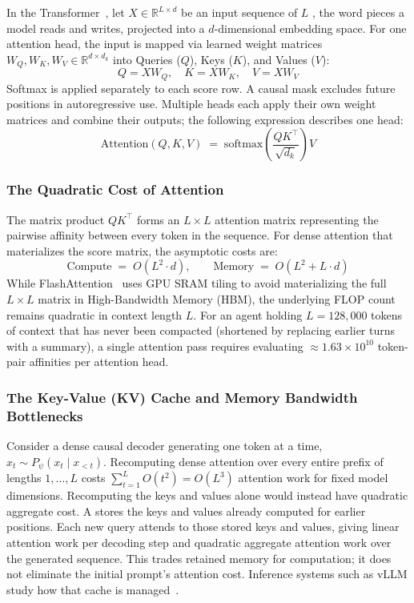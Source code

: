 In the Transformer~, let $X \in \mathbb{R}^{L \times d}$ be an input sequence of $L$ , the word pieces a model reads and writes, projected into a $d$-dimensional embedding space. For one attention head, the input is mapped via learned weight matrices $W_Q, W_K, W_V \in \mathbb{R}^{d \times d_k}$ into Queries ($Q$), Keys ($K$), and Values ($V$):
\begin{equation}
Q = X W_Q, \quad K = X W_K, \quad V = X W_V
\end{equation}
Softmax is applied separately to each score row. A causal mask excludes future positions in autoregressive use. Multiple heads each apply their own weight matrices and combine their outputs; the following expression describes one head:
\begin{equation}\label{eq:attention-formula}
\mathrm{Attention}(Q, K, V) \;=\; \mathrm{softmax}\left( \frac{Q K^\top}{\sqrt{d_k}} \right) V
\end{equation}

\subsubsection{The Quadratic Cost of Attention}
The matrix product $Q K^\top$ forms an $L \times L$ attention matrix representing the pairwise affinity between every token in the sequence. For dense attention that materializes the score matrix, the asymptotic costs are:
\begin{equation}
\mathrm{Compute} \;=\; O(L^2 \cdot d), \qquad \mathrm{Memory} \;=\; O(L^2 + L \cdot d)
\end{equation}
While FlashAttention~ uses GPU SRAM tiling to avoid materializing the full $L \times L$ matrix in High-Bandwidth Memory (HBM), the underlying FLOP count remains quadratic in context length $L$. For an agent holding $L = 128{,}000$ tokens of context that has never been compacted (shortened by replacing earlier turns with a summary), a single attention pass requires evaluating $\approx 1.63 \times 10^{10}$ token-pair affinities per attention head.

\subsubsection{The Key-Value (KV) Cache and Memory Bandwidth Bottlenecks}
Consider a dense causal decoder generating one token at a time,
$x_t\sim P_\psi(x_t\mid x_{<t})$. Recomputing dense attention over every
entire prefix of lengths $1,\ldots,L$ costs $\sum_{t=1}^L O(t^2)=O(L^3)$
attention work for fixed model dimensions. Recomputing the keys and values
alone would instead have quadratic aggregate cost. A 
stores the keys and values already computed for earlier positions. Each new
query attends to those stored keys and values, giving linear attention work per decoding step and quadratic
aggregate attention work over the generated sequence. This trades retained
memory for computation; it does not eliminate the initial prompt's attention
cost. Inference systems such as vLLM study how that cache is
managed~.

